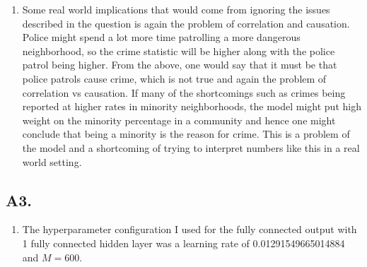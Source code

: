 \documentclass[12pt]{article}
\theoremstyle{definitionstyle}
\begin{document}
\begin{enumerate}[label=\alph*.]
        \item Some real world implications that would come from ignoring the issues described in the question is again the problem of correlation and causation. Police might spend a lot more time patrolling a more dangerous neighborhood, so the crime statistic will be higher along with the police patrol being higher. From the above, one would say that it must be that police patrols cause crime, which is not true and again the problem of correlation vs causation. If many of the shortcomings such as crimes being reported at higher rates in minority neighborhoods, the model might put high weight on the minority percentage in a community and hence one might conclude that being a minority is the reason for crime. This is a problem of the model and a shortcoming of trying to interpret numbers like this in a real world setting. 
    \end{enumerate}

    \subsection*{A3.}
    \begin{enumerate}[label=\alph*.]
        \item The hyperparameter configuration I used for the fully connected output with 1 fully connected hidden layer was a learning rate of 0.01291549665014884 and $M = 600$.
    \end{enumerate}
\end{document}
